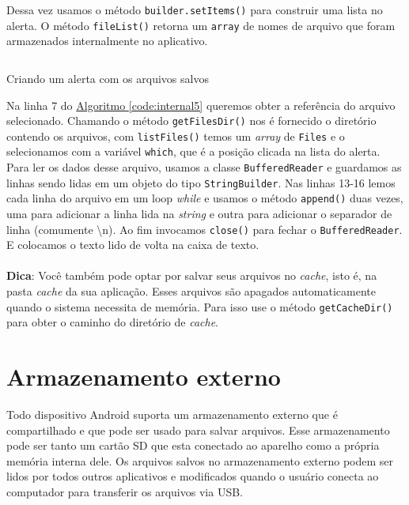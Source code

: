 \documentclass[a4paper,12pt,brazil,oneside]{book}
\begin{document}
		Dessa vez usamos o método \texttt{builder.setItems()} para construir uma lista no alerta. O método \texttt{fileList()} retorna um \texttt{array} de nomes de arquivo que foram armazenados internalmente no aplicativo. 

		\begin{listing}[H]
		\inputminted[linenos=true,fontsize=\small,frame=lines, framesep=2mm, tabsize=2,numbersep=5pt]{java}{src/api/storage/internal5.java}
		\caption{Criando um alerta com os arquivos salvos}
		\label{code:internal5}
		\end{listing} 	
		
		Na linha 7 do \hyperref[code:internal5]{Algoritmo \ref*{code:internal5}} queremos obter a referência do arquivo selecionado. Chamando o método \texttt{getFilesDir()} nos é fornecido o diretório contendo os arquivos, com \texttt{listFiles()} temos um \emph{array} de \texttt{Files} e o selecionamos com a variável \texttt{which}, que é a posição clicada na lista do alerta. Para ler os dados desse arquivo, usamos a classe \texttt{BufferedReader} e guardamos as linhas sendo lidas em um objeto do tipo \texttt{StringBuilder}. Nas linhas 13-16 lemos cada linha do arquivo em um loop \emph{while} e usamos o método \texttt{append()} duas vezes, uma para adicionar a linha lida na \emph{string} e outra para adicionar o separador de linha (comumente \textbackslash n). Ao fim invocamos \texttt{close()} para fechar o \texttt{BufferedReader}. E colocamos o texto lido de volta na caixa de texto.

\begin{framed}
\paragraph{}\textbf{Dica}: Você também pode optar por salvar seus arquivos no \emph{cache}, isto é, na pasta \emph{cache} da sua aplicação. Esses arquivos são apagados automaticamente quando o sistema necessita de memória. Para isso use o método \texttt{getCacheDir()} para obter o caminho do diretório de \emph{cache}.
\textit{}
\end{framed}

		\section{Armazenamento externo}

		Todo dispositivo Android suporta um armazenamento externo que é compartilhado e que pode ser usado para salvar arquivos. Esse armazenamento pode ser tanto um cartão SD que esta conectado ao aparelho como a própria memória interna dele. Os arquivos salvos no armazenamento externo podem ser lidos por todos outros aplicativos e modificados quando o usuário conecta ao computador para transferir os arquivos via USB.
\end{document}

